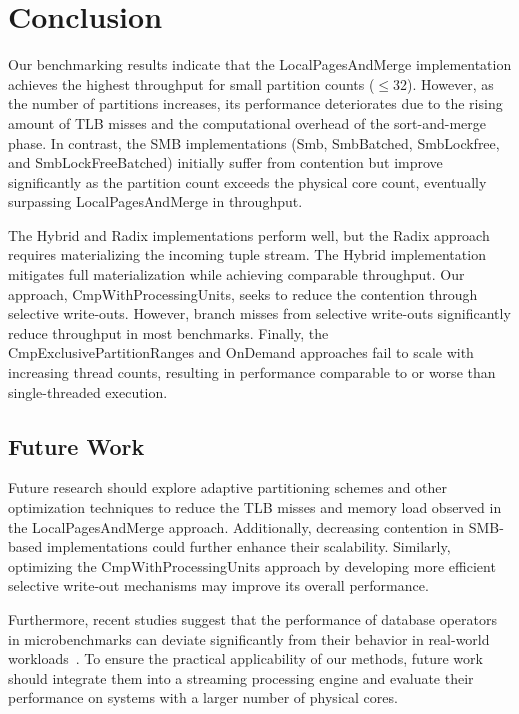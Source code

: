 
\chapter{Conclusion}\label{chapter:conclusion}\acresetall
Our benchmarking results indicate that the LocalPagesAndMerge implementation achieves the highest throughput for small partition counts ($\le$32).
However, as the number of partitions increases, its performance deteriorates due to the rising amount of \ac{TLB} misses and the computational overhead of the sort-and-merge phase.
In contrast, the \ac{SMB} implementations (Smb, SmbBatched, SmbLockfree, and SmbLockFreeBatched) initially suffer from contention but improve significantly as the partition count exceeds the physical core count, eventually surpassing LocalPagesAndMerge in throughput.

The Hybrid and Radix implementations perform well, but the Radix approach requires materializing the incoming tuple stream.
The Hybrid implementation mitigates full materialization while achieving comparable throughput.
Our approach, CmpWithProcessingUnits, seeks to reduce the contention through selective write-outs.
However, branch misses from selective write-outs significantly reduce throughput in most benchmarks.
Finally, the CmpExclusivePartitionRanges and OnDemand approaches fail to scale with increasing thread counts, resulting in performance comparable to or worse than single-threaded execution.
\section{Future Work}
Future research should explore adaptive partitioning schemes and other optimization techniques to reduce the \ac{TLB} misses and memory load observed in the LocalPagesAndMerge approach.
Additionally, decreasing contention in SMB-based implementations could further enhance their scalability.
Similarly, optimizing the CmpWithProcessingUnits approach by developing more efficient selective write-out mechanisms may improve its overall performance.

Furthermore, recent studies suggest that the performance of database operators in microbenchmarks can deviate significantly from their behavior in real-world workloads~\parencite{joins-real-system, benchmark-fail-real-world}.
To ensure the practical applicability of our methods, future work should integrate them into a streaming processing engine and evaluate their performance on systems with a larger number of physical cores.
